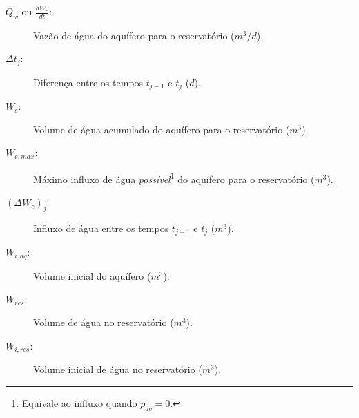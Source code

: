 \documentclass[final,5p]{elsarticle}
\numberwithin{equation}{section}
\begin{document}
\begin{description}
    \item[$Q_w$ ou $\frac{dW_e}{dt}$:]Vazão de água do aquífero para o reservatório ($m^3/d$).
    \item[$\Delta t_j$:]Diferença entre os tempos $t_{j-1}$ e $t_j$ ($d$).
    \item[$W_e$:]Volume de água acumulado do aquífero para o reservatório ($m^3$).
    \item[$W_{e,max}$:]Máximo influxo de água \emph{possível}\footnote{Equivale ao influxo quando $p_{aq}=0$.} do aquífero para o reservatório ($m^3$).
    \item[$(\Delta W_e)_j$:]Influxo de água entre os tempos $t_{j-1}$ e $t_j$ ($m^3$).
    \item[$W_{i,aq}$:]Volume inicial do aquífero ($m^3$).
    \item[$W_{res}$:]Volume de água no reservatório ($m^3$).
    \item[$W_{i,res}$:]Volume inicial de água no reservatório ($m^3$).
\end{description}













\end{document}
